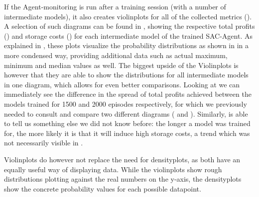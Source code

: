 If the Agent-monitoring is run after a training session (with a number of intermediate models), it also creates violinplots for all of the collected metrics (). A selection of such diagrams can be found in , showing the respective total profits () and storage costs () for each intermediate model of the trained SAC-Agent. As explained in , these plots visualize the probability distributions as shown in  in a more condensed way, providing additional data such as actual maximum, minimum and median values as well. The biggest upside of the Violinplots is however that they are able to show the distributions for all intermediate models in one diagram, which allows for even better comparisons. Looking at  we can immediately see the difference in the spread of total profits achieved between the models trained for 1500 and 2000 episodes respectively, for which we previously needed to consult and compare two different diagrams ( and ). Similarly,  is able to tell us something else we did not know before: the longer a model was trained for, the more likely it is that it will induce high storage costs, a trend which was not necessarily visible in .

Violinplots do however not replace the need for densityplots, as both have an equally useful way of displaying data. While the violinplots show rough distributions plotting against the real numbers on the y-axis, the densityplots show the concrete probability values for each possible datapoint.

